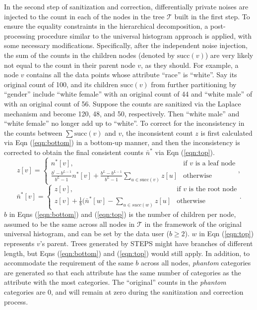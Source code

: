 \documentclass[12pt, A4]{article}
\theoremstyle{plain}
\theoremstyle{exampstyle}\newtheorem{defn}{Definition}
\theoremstyle{exampstyle}\newtheorem{lem}{Lemma}
\theoremstyle{exampstyle}\newtheorem{cor}{Corollary}
\theoremstyle{exampstyle}\newtheorem{pro}{Proposition}
\theoremstyle{exampstyle}\newtheorem{cla}{Claim}
\theoremstyle{exampstyle}\newtheorem{rem}{Remark}
\begin{document}
In the second step of sanitization and correction, differentially private noises are injected to the count in each of the nodes in the tree $\mathcal{T}$ built in the first step. To ensure the equality constraints in the hierarchical decomposition, a post-processing procedure similar to the universal histogram approach is applied, with some necessary modifications. Specifically, after the independent noise injection, the sum of the counts in the children nodes (denoted by $\mbox{succ}(v)$) are very likely not equal to the count in their parent node $v$, as they should. For example, a node $v$ contains all the  data points whose attribute ``race'' is ``white''. Say its original count of 100, and its children $\mbox{succ}(v)$ from further partitioning by ``gender''  include ``white female'' with an original count of 44  and ``white male'' of with an original count of 56. Suppose the counts are sanitized via the Laplace mechanism and become 120, 48, and 50, respectively. Then ``white male'' and ``white female'' no longer add up to ``white''.  To correct for the inconsistency in the counts between $\sum \mbox{succ}(v)$ and $v$, the inconsistent count $z$ is first calculated via Eqn (\ref{eqn:bottom}) in a bottom-up manner, and then the inconsistency is corrected to obtain the final consistent counts $\bar{n}^*$ via Eqn (\ref{eqn:top}).
\begin{equation}\label{eqn:bottom}
z[v]=
\begin{cases}
n^*[v], & \text{if } v \text{ is a leaf node}   \\
\frac{b^l-b^{L-1}}{b^L-1}n^*[v]+ \frac{b^L-b^{L-1}}{b^L-1}\sum_{u\in \mbox{succ}(v)}z[u] & \text{otherwise}
\end{cases},
\end{equation}
\begin{equation}\label{eqn:top}
\bar{n}^*[v]=
\begin{cases}
z[v], & \text{if } v \text{ is the root node}   \\
z[v]+\frac{1}{b}(\bar{n}^*[w]-\sum_{u\in succ(w)}z[u] & \text{otherwise}
\end{cases}.
\end{equation}
$b$ in Eqns (\ref{eqn:bottom}) and (\ref{eqn:top}) is the number of children per node, assumed to be the same across all nodes in $\mathcal{T}$ in the framework of the original universal histogram, and can be set by the data user ($b\ge2$). $w$ in  Eqn (\ref{eqn:top}) represents $v$'s parent. Trees generated by STEPS  might have branches of different length, but Eqns (\ref{eqn:bottom}) and (\ref{eqn:top}) would still apply. In addition, to accommodate the requirement of the same $b$ across all nodes, \emph{phantom} categories are generated so that each attribute has the same number of categories as the attribute with the most categories. The ``original'' counts in the \emph{phantom} categories are 0, and will remain at zero during the sanitization and correction process.
\end{document}
